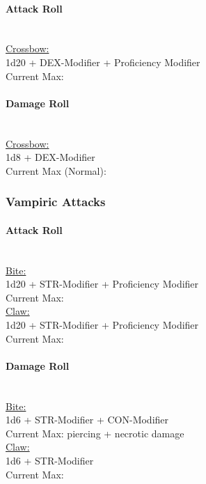 \documentclass[letterpaper,openany,oneside,twocolumn]{book}
\begin{document}
\paragraph*{Attack Roll}\hfill\\
\underline{Crossbow:}\\
1d20 + DEX-Modifier + Proficiency Modifier\\
\indent Current Max: 
\paragraph*{Damage Roll}\hfill\\
\underline{Crossbow:}\\
1d8 + DEX-Modifier\\
\indent Current Max (Normal): 
\subsubsection*{Vampiric Attacks}
\paragraph*{Attack Roll}\hfill\\
\underline{Bite:}\\
1d20 + STR-Modifier + Proficiency Modifier\\
\indent Current Max: \\
\underline{Claw:}\\
1d20 + STR-Modifier + Proficiency Modifier\\
\indent Current Max: 
\paragraph*{Damage Roll}\hfill\\
\underline{Bite:}\\
1d6 + STR-Modifier + CON-Modifier\\
\indent Current Max:  piercing +  necrotic damage\\
\underline{Claw:}\\
1d6 + STR-Modifier\\
\indent Current Max: 
\end{document}
